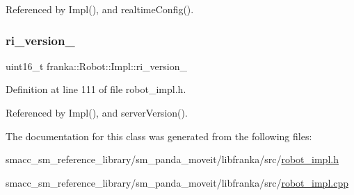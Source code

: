 Referenced by Impl(), and realtime\+Config().

\mbox{\label{classfranka_1_1Robot_1_1Impl_a9e5d9b45a15e1e23dd09e4d2fe272833}} 
\subsubsection{\texorpdfstring{ri\+\_\+version\+\_\+}{ri\_version\_}}
{\footnotesize\ttfamily uint16\+\_\+t franka\+::\+Robot\+::\+Impl\+::ri\+\_\+version\+\_\+\hspace{0.3cm}{\ttfamily [private]}}



Definition at line 111 of file robot\+\_\+impl.\+h.



Referenced by Impl(), and server\+Version().



The documentation for this class was generated from the following files\+:\begin{DoxyCompactItemize}
\item 
smacc\+\_\+sm\+\_\+reference\+\_\+library/sm\+\_\+panda\+\_\+moveit/libfranka/src/\hyperlink{robot__impl_8h}{robot\+\_\+impl.\+h}\item 
smacc\+\_\+sm\+\_\+reference\+\_\+library/sm\+\_\+panda\+\_\+moveit/libfranka/src/\hyperlink{robot__impl_8cpp}{robot\+\_\+impl.\+cpp}\end{DoxyCompactItemize}
